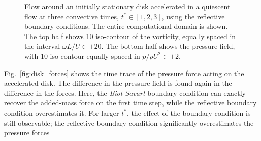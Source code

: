 \documentclass[preprint,12pt]{elsarticle}
\begin{document}
\begin{figure}
\begin{subfigure}{.33\textwidth}
    \end{subfigure}
    \caption{Flow around an initially stationary disk accelerated in a quiescent flow at three convective times, $t^*\in [1,2,3]$, using the reflective boundary conditions. The entire computational domain is shown. The top half shows 10 iso-contour of the vorticity, equally spaced in the interval $\omega L/U\in\pm20$. The bottom half shows the pressure field, with 10 iso-contour equally spaced in $p/\rho U^2\in\pm2$.}
    \label{fig:disk_flow_1}
\end{figure}


Fig.~\ref{fig:disk_forces} shows the time trace of the pressure force acting on the accelerated disk. The difference in the pressure field is found again in the difference in the forces. Here, the \emph{Biot-Savart} boundary condition can exactly recover the added-mass force on the first time step, while the reflective boundary condition overestimates it. For larger $t^*$, the effect of the boundary condition is still observable; the reflective boundary condition significantly overestimates the pressure forces
\end{document}
